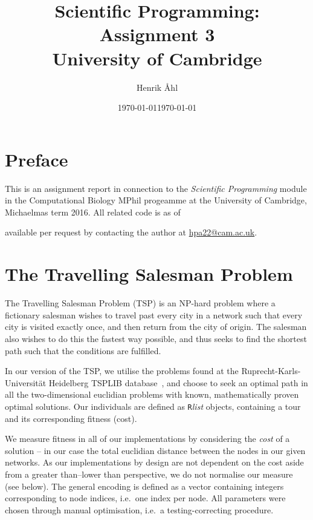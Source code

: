 \documentclass[10pt, twocolumn]{article}\usepackage[]{graphicx}\usepackage[]{color}
\title
{
\textbf
{
Scientific Programming: Assignment 3}\\[1em]
\small{University of Cambridge}
}
\author{Henrik Åhl}
\date{\today}
\theoremstyle{plain}
\newcommand{\R}{\texttt{R}}
\begin{document}
\maketitle
\section*{Preface}
This is an assignment report in connection to the \textit{Scientific Programming} module in the Computational Biology MPhil progeamme at the University of Cambridge, Michaelmas term 2016. All related code is as of \date{\today} available per request by contacting the author at \href{mailto:hpa22@cam.ac.uk}{hpa22@cam.ac.uk}.

\section{The Travelling Salesman Problem}
The Travelling Salesman Problem (TSP) is an NP-hard problem where a fictionary salesman wishes to travel past every city in a network such that every city is visited exactly once, and then return from the city of origin. The salesman also wishes to do this the fastest way possible, and thus seeks to find the shortest path such that the conditions are fulfilled. 
  
In our version of the TSP, we utilise the problems found at the Ruprecht-Karls-Universität Heidelberg TSPLIB database~\cite{tsplib}, and choose to seek an optimal path in all the two-dimensional euclidian problems with known, mathematically proven optimal solutions. Our individuals are defined as \R \textit{list} objects, containing a tour and its corresponding fitness (cost). 

We measure fitness in all of our implementations by considering the \textit{cost} of a solution -- in our case the total euclidian distance between the nodes in our given networks. As our implementations by design are not dependent on the cost aside from a greater than--lower than perspective, we do not normalise our measure (see below). The general encoding is defined as a vector containing integers corresponding to node indices, i.e.\ one index per node. All parameters were chosen through manual optimisation, i.e.\ a testing-correcting procedure.
\end{document}
